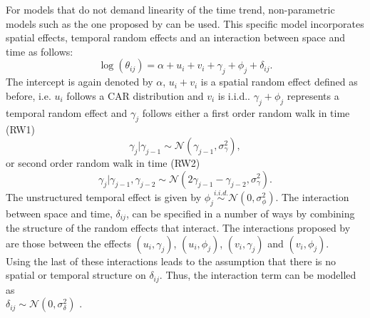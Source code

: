 For models that do not demand linearity of the time trend, non-parametric models such as the one proposed by \cite{knorr2000bayesian} can be used. This specific model incorporates spatial effects, temporal random effects and an interaction between space and time as follows:
\begin{equation}
    \log\left(\theta_{ij}\right)=\alpha+u_i+v_i+\gamma_j+\phi_j+\delta_{ij}.
\end{equation}
\newpage
The intercept is again denoted by $\alpha$, $u_i + v_i$ is a spatial random effect defined as before, i.e. $u_i$ follows a CAR distribution and $v_i$ is i.i.d.. $\gamma_j+\phi_j$ represents a temporal random effect and $\gamma_j$ follows either a first order random walk in time (RW1)
\begin{equation}
    \gamma_j|\gamma_{j-1}\sim\mathcal{N}\left(\gamma_{j-1},\sigma_\gamma^2\right),
\end{equation}
or second order random walk in time (RW2)
\begin{equation}
    \gamma_j|\gamma_{j-1},\gamma_{j-2}\sim\mathcal{N}\left(2\gamma_{j-1}-\gamma_{j-2},\sigma_\gamma^2\right).
\end{equation}
The unstructured temporal effect is given by $\phi_j\overset{i.i.d.}{\sim}\mathcal{N}\left(0, \sigma_\phi^2\right)$. The interaction between space and time, $\delta_{ij}$, can be specified in a number of ways by combining the structure of the random effects that interact. The interactions proposed by \cite{knorr2000bayesian} are those between the effects $\left(u_i,\gamma_j\right)$, $\left(u_i,\phi_j\right)$, $\left(v_i,\gamma_j\right)$ and $\left(v_i,\phi_j\right)$. \\
Using the last of these interactions leads to the assumption that there is no spatial or temporal structure on $\delta_{ij}$. Thus, the interaction term can be modelled as \\ $\delta_{ij}\sim\mathcal{N}\left(0,\sigma_\delta^2\right)$ \autocite[][]{moraga2019geospatial}.
